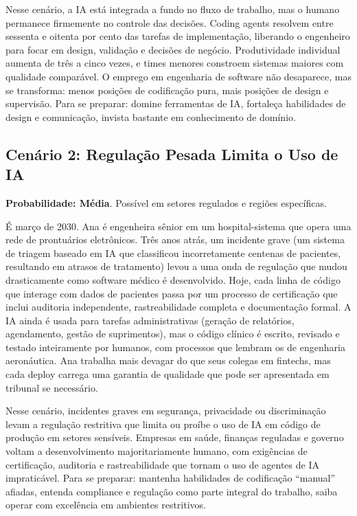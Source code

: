 Nesse cenário, a IA está integrada a fundo no fluxo de trabalho, mas o humano permanece firmemente no controle das decisões. Coding agents resolvem entre sessenta e oitenta por cento das tarefas de implementação, liberando o engenheiro para focar em design, validação e decisões de negócio. Produtividade individual aumenta de três a cinco vezes, e times menores constroem sistemas maiores com qualidade comparável. O emprego em engenharia de software não desaparece, mas se transforma: menos posições de codificação pura, mais posições de design e supervisão. Para se preparar: domine ferramentas de IA, fortaleça habilidades de design e comunicação, invista bastante em conhecimento de domínio.

\subsection{Cenário 2: Regulação Pesada Limita o Uso de IA}

\textbf{Probabilidade: Média}. Possível em setores regulados e regiões específicas.

É março de 2030. Ana é engenheira sênior em um hospital-sistema que opera uma rede de prontuários eletrônicos. Três anos atrás, um incidente grave (um sistema de triagem baseado em IA que classificou incorretamente centenas de pacientes, resultando em atrasos de tratamento) levou a uma onda de regulação que mudou drasticamente como software médico é desenvolvido. Hoje, cada linha de código que interage com dados de pacientes passa por um processo de certificação que inclui auditoria independente, rastreabilidade completa e documentação formal. A IA ainda é usada para tarefas administrativas (geração de relatórios, agendamento, gestão de suprimentos), mas o código clínico é escrito, revisado e testado inteiramente por humanos, com processos que lembram os de engenharia aeronáutica. Ana trabalha mais devagar do que seus colegas em fintechs, mas cada deploy carrega uma garantia de qualidade que pode ser apresentada em tribunal se necessário.

Nesse cenário, incidentes graves em segurança, privacidade ou discriminação levam a regulação restritiva que limita ou proíbe o uso de IA em código de produção em setores sensíveis. Empresas em saúde, finanças reguladas e governo voltam a desenvolvimento majoritariamente humano, com exigências de certificação, auditoria e rastreabilidade que tornam o uso de agentes de IA impraticável. Para se preparar: mantenha habilidades de codificação ``manual'' afiadas, entenda compliance e regulação como parte integral do trabalho, saiba operar com excelência em ambientes restritivos.

